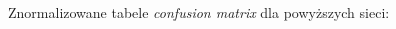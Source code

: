 \documentclass[polish,12pt]{aghthesis}
\begin{document}
\par\noindent Znormalizowane tabele \textit{confusion matrix} dla powyższych sieci:
\begin{figure}[h!]%
    \begin{adjustbox}{minipage=1.0\paperwidth, pagecenter}
    \centering
    \qquad
    \end{adjustbox}
\end{figure}
\end{document}
